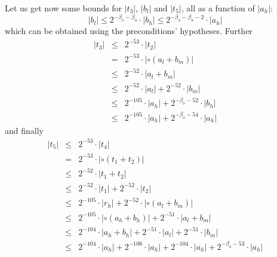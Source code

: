\documentclass[a4paper,10pt,twoside]{article}
\newenvironment{proof}[1][Proof]{\begin{trivlist}
\item[\hskip \labelsep {\bfseries #1}]}{\end{trivlist}}
\newcommand{\hi}{\ensuremath{\mathit{h}}}
\newcommand{\mi}{\ensuremath{\mathit{m}}}
\newcommand{\lo}{\ensuremath{\mathit{l}}}
\begin{document}
\begin{proof}
Let us get now some bounds for $\left \vert t_3 \right \vert$, $\left \vert b_\lo \right \vert$ and 
$\left \vert t_5 \right \vert$, all as a function of
$\left \vert a_\hi \right \vert$:
$$\left \vert b_\lo \right \vert \leq 2^{-\beta_o-\beta_u} \cdot \left \vert b_\hi \right \vert \leq 
2^{-\beta_o-\beta_u-2} \cdot \left \vert a_\hi \right \vert$$
which can be obtained using the preconditions' hypotheses. Further
\begin{eqnarray*}
\left \vert t_3 \right \vert & \leq & 2^{-53} \cdot \left \vert t_2 \right \vert \\
& = & 2^{-53} \cdot \left \vert \circ \left( a_\lo + b_\mi \right) \right \vert \\
& \leq & 2^{-52} \cdot \left \vert a_\lo + b_\mi \right \vert \\
& \leq & 2^{-52} \cdot \left \vert a_\lo \right \vert + 2^{-52} \cdot \left \vert b_\mi \right \vert \\
& \leq & 2^{-105} \cdot \left \vert a_\hi \right \vert + 2^{-\beta_o-52} \cdot \left \vert b_\hi \right \vert \\
& \leq & 2^{-105} \cdot \left \vert a_\hi \right \vert + 2^{-\beta_o-54} \cdot \left \vert a_\hi \right \vert
\end{eqnarray*}
and finally
\begin{eqnarray*}
\left \vert t_5 \right \vert & \leq & 2^{-53} \cdot \left \vert t_4 \right \vert \\
& = & 2^{-53} \cdot \left \vert \circ \left( t_1 + t_2 \right) \right \vert \\
& \leq & 2^{-52} \cdot \left \vert t_1 + t_2 \right \vert \\
& \leq & 2^{-52} \cdot \left \vert t_1 \right \vert + 2^{-52} \cdot \left \vert t_2 \right \vert \\
& \leq & 2^{-105} \cdot \left \vert r_\hi \right \vert + 2^{-52} \cdot \left \vert \circ \left( a_\lo + b_\mi \right) \right \vert \\
& \leq & 2^{-105} \cdot \left \vert \circ \left( a_\hi + b_\hi \right) \right \vert + 2^{-51} \cdot \left \vert a_\lo + b_\mi \right \vert \\
& \leq & 2^{-104} \cdot \left \vert a_\hi + b_\hi \right \vert + 2^{-51} \cdot \left \vert a_\lo \right \vert + 
2^{-51} \cdot \left \vert b_\mi \right \vert \\
& \leq & 2^{-104} \cdot \left \vert a_\hi \right \vert + 2^{-106} \cdot \left \vert a_\hi \right \vert + 
2^{-104} \cdot \left \vert a_\hi \right \vert + 2^{-\beta_o-53} \cdot \left \vert a_\hi \right \vert \\

\end{eqnarray*}
\end{proof}
\end{document}
